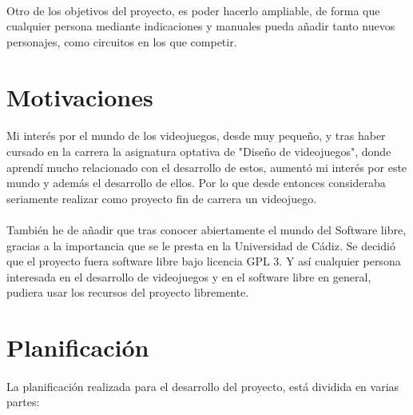 \documentclass[a4paper,11pt]{article} %
\begin{document}
\paragraph{}
Otro de los objetivos del proyecto, es poder hacerlo ampliable, de forma que cualquier persona mediante indicaciones y manuales
pueda añadir tanto nuevos personajes, como circuitos en los que competir.

\section{Motivaciones}

\paragraph{}
Mi interés por el mundo de los videojuegos, desde muy pequeño, y tras haber cursado en la carrera
la asignatura optativa de "Diseño de videojuegos", donde aprendí mucho
relacionado con el desarrollo de estos,
aumentó mi interés por este mundo y además el desarrollo de ellos. Por lo que desde entonces consideraba seriamente realizar 
como proyecto fin de carrera un videojuego.

\paragraph{}
También he de añadir que tras conocer abiertamente el mundo del Software libre, gracias a la importancia que se le presta
en la Universidad de Cádiz. Se decidió que el proyecto fuera software libre bajo licencia GPL 3. Y así cualquier persona
interesada en el desarrollo de videojuegos y en el software libre en general, pudiera usar los recursos del proyecto
libremente.

\section{Planificación}

\paragraph{}
La planificación realizada para el desarrollo del proyecto, está dividida en varias partes:
\end{document}
